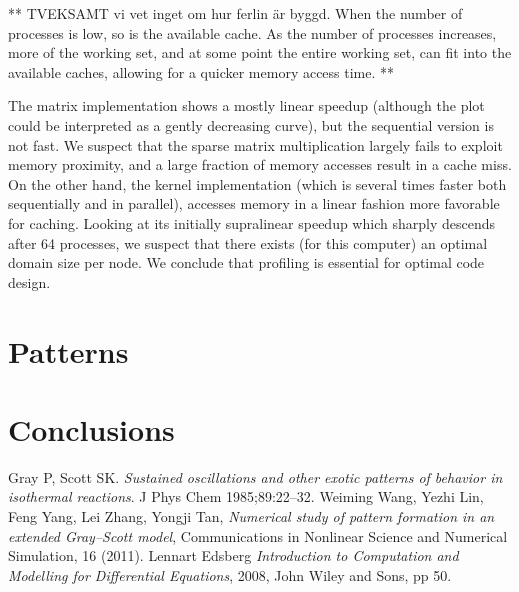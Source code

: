 \documentclass[a4paper,11pt]{article}
\begin{document}
** TVEKSAMT vi vet inget om hur ferlin är byggd. When the number of processes is low, so is the available cache.  As the number of processes increases, more of the working set, and at some point the entire working set, can fit into the available caches, allowing for a quicker memory access time. **

The matrix implementation shows a mostly linear speedup (although the plot could be interpreted as a gently decreasing curve), but the sequential version is not fast. We suspect that the sparse matrix multiplication largely fails to exploit memory proximity, and a large fraction of memory accesses result in a cache miss. On the other hand, the kernel implementation (which is several times faster both sequentially and in parallel), accesses memory in a linear fashion more favorable for caching. Looking at its initially supralinear speedup which sharply descends after 64 processes, we suspect that there exists (for this computer) an optimal domain size per node. We conclude that profiling is essential for optimal code design.

\section*{Patterns}
\section*{Conclusions}

\clearpage
\begin{thebibliography}{}
 Gray P, Scott SK. {\it Sustained oscillations and other exotic patterns of behavior in isothermal reactions}. J Phys Chem 1985;89:22–32.
 Weiming Wang, Yezhi Lin, Feng Yang, Lei Zhang, Yongji Tan, {\it Numerical study of pattern formation in an extended Gray–Scott model}, Communications in Nonlinear Science and Numerical Simulation, 16 (2011).
 Lennart Edsberg {\it Introduction to Computation and Modelling for Differential Equations}, 2008, John Wiley and Sons, pp 50.
\end{thebibliography}
\end{document}
